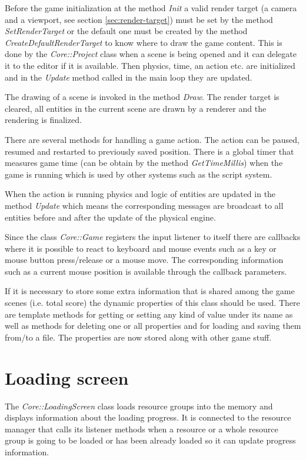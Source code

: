 \documentclass[a4paper, 12pt]{report}
\begin{document}
Before the game initialization at the method \emph{Init} a valid render target (a camera and a viewport, see section \ref{sec:render-target}) must be set by the method \emph{SetRenderTarget} or the default one must be created by the method \emph{CreateDefaultRenderTarget} to know where to draw the game content. This is done by the \emph{Core::Project} class when a scene is being opened and it can delegate it to the editor if it is available. Then physics, time, an action etc. are initialized and in the \emph{Update} method called in the main loop they are updated.

The drawing of a scene is invoked in the method \emph{Draw}. The render target is cleared, all entities in the current scene are drawn by a renderer and the rendering is finalized.

There are several methods for handling a game action. The action can be paused, resumed and restarted to previously saved position. There is a global timer that measures game time (can be obtain by the method \emph{GetTimeMillis}) when the game is running which is used by other systems such as the script system.

When the action is running physics and logic of entities are updated in the method \emph{Update} which means the corresponding messages are broadcast to all entities before and after the update of the physical engine.

Since the class \emph{Core::Game} registers the input listener to itself there are callbacks where it is possible to react to keyboard and mouse events such as a key or mouse button press/release or a mouse move. The corresponding information such as a current mouse position is available through the callback parameters.

If it is necessary to store some extra information that is shared among the game scenes (i.e. total score) the dynamic properties of this class should be used. There are template methods for getting or setting any kind of value under its name as well as methods for deleting one or all properties and for loading and saving them from/to a file. The properties are now stored along with other game stuff.

\section{Loading screen}

The \emph{Core::LoadingScreen} class loads resource groups into the memory and displays information about the loading progress. It is connected to the resource manager that calls its listener methods when a resource or a whole resource group is going to be loaded or has been already loaded so it can update progress information.
\end{document}

